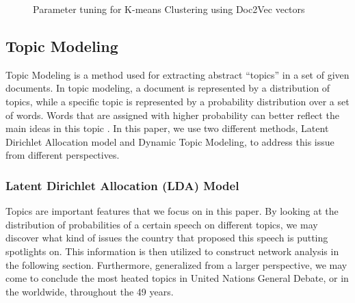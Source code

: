 \documentclass[final,authoryear,3p,12pt,times,hidelinks]{elsarticle}
\begin{document}
\begin{figure}[ht!]
  \centering
  \qquad
  \caption{Parameter tuning for K-means Clustering using Doc2Vec vectors}
  \label{fig:kmeans tunning doc2vec}
\end{figure}

\subsection{Topic Modeling}
\label{subsec:Topic Modeling}
Topic Modeling is a method used for extracting abstract “topics” in a set of given documents. In topic modeling, a document is represented by a distribution of topics, while a specific topic is represented by a probability distribution over a set of words. Words that are assigned with higher probability can better reflect the main ideas in this topic \citep{griffiths2007topics}. In this paper, we use two different methods, Latent Dirichlet Allocation model and Dynamic Topic Modeling, to address this issue from different perspectives. 

\subsubsection{Latent Dirichlet Allocation (LDA) Model}
\label{subsec:LDA}
Topics are important features that we focus on in this paper. By looking at the distribution of probabilities of a certain speech on different topics, we may discover what kind of issues the country that proposed this speech is putting spotlights on. This information is then utilized to construct network analysis in the following section. Furthermore, generalized from a larger perspective, we may come to conclude the most heated topics in United Nations General Debate, or in the worldwide, throughout the 49 years.
\end{document}
